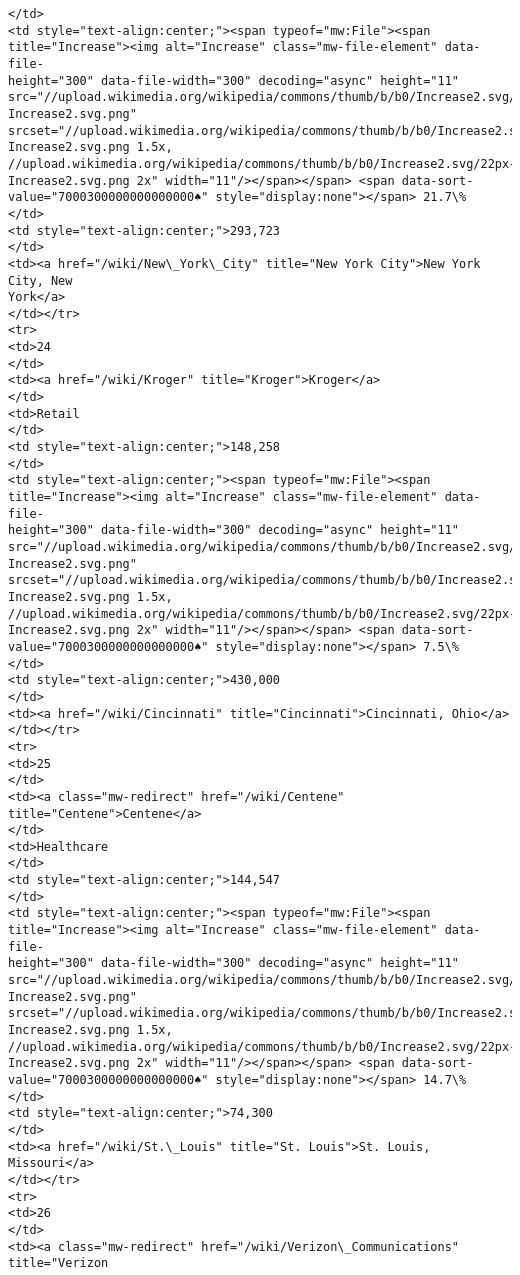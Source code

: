 \documentclass[11pt]{article}
\begin{document}
\begin{Verbatim}[commandchars=\\\{\}]
</td>
<td style="text-align:center;"><span typeof="mw:File"><span
title="Increase"><img alt="Increase" class="mw-file-element" data-file-
height="300" data-file-width="300" decoding="async" height="11"
src="//upload.wikimedia.org/wikipedia/commons/thumb/b/b0/Increase2.svg/11px-
Increase2.svg.png"
srcset="//upload.wikimedia.org/wikipedia/commons/thumb/b/b0/Increase2.svg/17px-
Increase2.svg.png 1.5x,
//upload.wikimedia.org/wikipedia/commons/thumb/b/b0/Increase2.svg/22px-
Increase2.svg.png 2x" width="11"/></span></span> <span data-sort-
value="7000300000000000000♠" style="display:none"></span> 21.7\%
</td>
<td style="text-align:center;">293,723
</td>
<td><a href="/wiki/New\_York\_City" title="New York City">New York City, New
York</a>
</td></tr>
<tr>
<td>24
</td>
<td><a href="/wiki/Kroger" title="Kroger">Kroger</a>
</td>
<td>Retail
</td>
<td style="text-align:center;">148,258
</td>
<td style="text-align:center;"><span typeof="mw:File"><span
title="Increase"><img alt="Increase" class="mw-file-element" data-file-
height="300" data-file-width="300" decoding="async" height="11"
src="//upload.wikimedia.org/wikipedia/commons/thumb/b/b0/Increase2.svg/11px-
Increase2.svg.png"
srcset="//upload.wikimedia.org/wikipedia/commons/thumb/b/b0/Increase2.svg/17px-
Increase2.svg.png 1.5x,
//upload.wikimedia.org/wikipedia/commons/thumb/b/b0/Increase2.svg/22px-
Increase2.svg.png 2x" width="11"/></span></span> <span data-sort-
value="7000300000000000000♠" style="display:none"></span> 7.5\%
</td>
<td style="text-align:center;">430,000
</td>
<td><a href="/wiki/Cincinnati" title="Cincinnati">Cincinnati, Ohio</a>
</td></tr>
<tr>
<td>25
</td>
<td><a class="mw-redirect" href="/wiki/Centene" title="Centene">Centene</a>
</td>
<td>Healthcare
</td>
<td style="text-align:center;">144,547
</td>
<td style="text-align:center;"><span typeof="mw:File"><span
title="Increase"><img alt="Increase" class="mw-file-element" data-file-
height="300" data-file-width="300" decoding="async" height="11"
src="//upload.wikimedia.org/wikipedia/commons/thumb/b/b0/Increase2.svg/11px-
Increase2.svg.png"
srcset="//upload.wikimedia.org/wikipedia/commons/thumb/b/b0/Increase2.svg/17px-
Increase2.svg.png 1.5x,
//upload.wikimedia.org/wikipedia/commons/thumb/b/b0/Increase2.svg/22px-
Increase2.svg.png 2x" width="11"/></span></span> <span data-sort-
value="7000300000000000000♠" style="display:none"></span> 14.7\%
</td>
<td style="text-align:center;">74,300
</td>
<td><a href="/wiki/St.\_Louis" title="St. Louis">St. Louis, Missouri</a>
</td></tr>
<tr>
<td>26
</td>
<td><a class="mw-redirect" href="/wiki/Verizon\_Communications" title="Verizon

\end{Verbatim}
\end{document}
